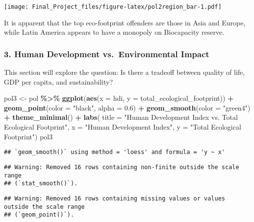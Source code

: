 \documentclass[
]{article}
\newenvironment{Shaded}{\begin{snugshade}}{\end{snugshade}}
\newcommand{\AttributeTok}[1]{\textcolor[rgb]{0.13,0.29,0.53}{#1}}
\newcommand{\FloatTok}[1]{\textcolor[rgb]{0.00,0.00,0.81}{#1}}
\newcommand{\FunctionTok}[1]{\textcolor[rgb]{0.13,0.29,0.53}{\textbf{#1}}}
\newcommand{\NormalTok}[1]{#1}
\newcommand{\OtherTok}[1]{\textcolor[rgb]{0.56,0.35,0.01}{#1}}
\newcommand{\SpecialCharTok}[1]{\textcolor[rgb]{0.81,0.36,0.00}{\textbf{#1}}}
\newcommand{\StringTok}[1]{\textcolor[rgb]{0.31,0.60,0.02}{#1}}
\begin{document}
\texttt{[image: Final\_Project\_files/figure-latex/pol2region\_bar-1.pdf]}

It is apparent that the top eco-footprint offenders are those in Asia
and Europe, while Latin America appears to have a monopoly on
Biocapacity reserve.

\subsubsection{3. Human Development vs.~Environmental
Impact}\label{human-development-vs.-environmental-impact}

This section will explore the question: Is there a tradeoff between
quality of life, GDP per capita, and sustainability?

\begin{Shaded}
\begin{Highlighting}[]
\NormalTok{pol3 }\OtherTok{\textless{}{-}}\NormalTok{ pol }\SpecialCharTok{\%\textgreater{}\%}
  \FunctionTok{ggplot}\NormalTok{(}\FunctionTok{aes}\NormalTok{(}\AttributeTok{x =}\NormalTok{ hdi, }\AttributeTok{y =}\NormalTok{ total\_ecological\_footprint)) }\SpecialCharTok{+}
  \FunctionTok{geom\_point}\NormalTok{(}\AttributeTok{color =} \StringTok{"black"}\NormalTok{, }\AttributeTok{alpha =} \FloatTok{0.6}\NormalTok{) }\SpecialCharTok{+}
  \FunctionTok{geom\_smooth}\NormalTok{(}\AttributeTok{color =} \StringTok{"green4"}\NormalTok{) }\SpecialCharTok{+}
  \FunctionTok{theme\_minimal}\NormalTok{() }\SpecialCharTok{+}
  \FunctionTok{labs}\NormalTok{( }\AttributeTok{title =} \StringTok{"Human Development Index vs. Total Ecological Footprint"}\NormalTok{,}
        \AttributeTok{x =} \StringTok{"Human Development Index"}\NormalTok{,}
        \AttributeTok{y =} \StringTok{"Total Ecological Footprint"}\NormalTok{)}
\NormalTok{pol3}
\end{Highlighting}
\end{Shaded}

\begin{verbatim}
## `geom_smooth()` using method = 'loess' and formula = 'y ~ x'
\end{verbatim}

\begin{verbatim}
## Warning: Removed 16 rows containing non-finite outside the scale range
## (`stat_smooth()`).
\end{verbatim}

\begin{verbatim}
## Warning: Removed 16 rows containing missing values or values outside the scale range
## (`geom_point()`).
\end{verbatim}
\end{document}

